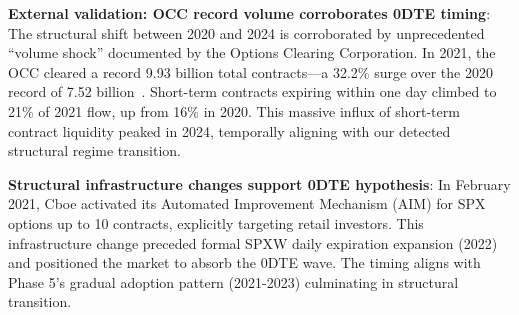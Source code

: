 \vspace{0.2cm}

\noindent\textbf{External validation: OCC record volume corroborates 0DTE timing}: The structural shift between 2020 and 2024 is corroborated by unprecedented ``volume shock'' documented by the Options Clearing Corporation. In 2021, the OCC cleared a record 9.93 billion total contracts—a 32.2\% surge over the 2020 record of 7.52 billion~\citep{occ2022record}. Short-term contracts expiring within one day climbed to 21\% of 2021 flow, up from 16\% in 2020. This massive influx of short-term contract liquidity peaked in 2024, temporally aligning with our detected structural regime transition.

\vspace{0.2cm}

\noindent\textbf{Structural infrastructure changes support 0DTE hypothesis}: In February 2021, Cboe activated its Automated Improvement Mechanism (AIM) for SPX options up to 10 contracts, explicitly targeting retail investors. This infrastructure change preceded formal SPXW daily expiration expansion (2022) and positioned the market to absorb the 0DTE wave. The timing aligns with Phase 5's gradual adoption pattern (2021-2023) culminating in structural transition.

\vspace{0.2cm}

